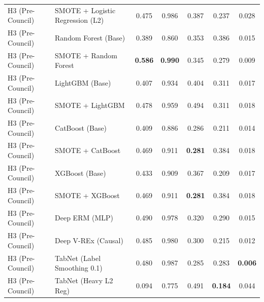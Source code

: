 \begin{table}[htbp]
{\begin{tabular}{llccccc}
H3 (Pre-Council) & SMOTE + Logistic Regression (L2) & 0.475 & 0.986 & 0.387 & 0.237 & 0.028 \\
H3 (Pre-Council) & Random Forest (Base) & 0.389 & 0.860 & 0.353 & 0.386 & 0.015 \\
H3 (Pre-Council) & SMOTE + Random Forest & \textbf{0.586} & \textbf{0.990} & 0.345 & 0.279 & 0.009 \\
H3 (Pre-Council) & LightGBM (Base) & 0.407 & 0.934 & 0.404 & 0.311 & 0.017 \\
H3 (Pre-Council) & SMOTE + LightGBM & 0.478 & 0.959 & 0.494 & 0.311 & 0.018 \\
H3 (Pre-Council) & CatBoost (Base) & 0.409 & 0.886 & 0.286 & 0.211 & 0.014 \\
H3 (Pre-Council) & SMOTE + CatBoost & 0.469 & 0.911 & \textbf{0.281} & 0.384 & 0.018 \\
H3 (Pre-Council) & XGBoost (Base) & 0.433 & 0.909 & 0.367 & 0.209 & 0.017 \\
H3 (Pre-Council) & SMOTE + XGBoost & 0.469 & 0.911 & \textbf{0.281} & 0.384 & 0.018 \\
H3 (Pre-Council) & Deep ERM (MLP) & 0.490 & 0.978 & 0.320 & 0.290 & 0.015 \\
H3 (Pre-Council) & Deep V-REx (Causal) & 0.485 & 0.980 & 0.300 & 0.215 & 0.012 \\
H3 (Pre-Council) & TabNet (Label Smoothing 0.1) & 0.480 & 0.987 & 0.285 & 0.283 & \textbf{0.006} \\
H3 (Pre-Council) & TabNet (Heavy L2 Reg) & 0.094 & 0.775 & 0.491 & \textbf{0.184} & 0.044 \\
\bottomrule
\end{tabular}%
}
\end{table}
